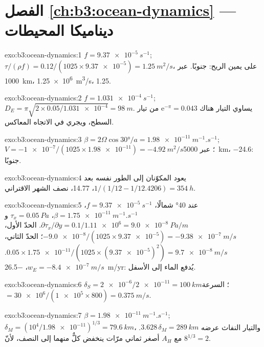 \section*{الفصل \ref{ch:b3:ocean-dynamics} --- ديناميكا المحيطات}

\begin{solution}{exo:b3:ocean-dynamics:1}
$f = \qty{9.37e-5}{s^{-1}}$; $\tau/(\rho f) = 0.12/(1025\times\num{9.37e-5})
= \qty{1.25}{m^2/s}$، على يمين الريح: جنوبًا. عبر
\qty{1000}{km}، \qty{1.25e6}{m^3/s}، \qty{1.25}{\sverdrup}.
\end{solution}

\begin{solution}{exo:b3:ocean-dynamics:2}
$f = \qty{1.031e-4}{s^{-1}}$; $D_E = \pi\sqrt{2\times0.05/\num{1.031e-4}}
= \qty{98}{m}$. يساوي التيار هناك $\mathrm e^{-\pi} = \num{0.043}$ من
تيار السطح، ويجري في الاتجاه المعاكس.
\end{solution}

\begin{solution}{exo:b3:ocean-dynamics:3}
$\beta = 2\Omega\cos\ang{30}/a = \qty{1.98e-11}{m^{-1}.s^{-1}}$; $V =
\num{-1e-7}/(1025\times\num{1.98e-11}) = \qty{-4.92}{m^2/s}$؛ عبر
\qty{5000}{km}، \qty{-24.6}{\sverdrup}: جنوبًا.
\end{solution}

\begin{solution}{exo:b3:ocean-dynamics:4}
يعود المكوّنان إلى الطور نفسه بعد $1/(1/12 - 1/12.4206) =
\qty{354}{h}$، \num{14.77}، نصف الشهر الاقتراني.
\end{solution}

\begin{solution}{exo:b3:ocean-dynamics:5}
عند \ang{40} شمالًا، $f = \qty{9.37e-5}{s^{-1}}$، $\beta =
\qty{1.75e-11}{m^{-1}.s^{-1}}$، $\tau_x = \qty{0.05}{Pa}$
و$\partial\tau_x/\partial y = 0.1/\num{1.11e6} = \qty{9.0e-8}{Pa/m}$. الحدّ
الأول، $-\num{9.0e-8}/(1025\times\num{9.37e-5}) =
\qty{-9.38e-7}{m/s}$؛ الحدّ الثاني، $0.05\times\num{1.75e-11}/(1025\times
(\num{9.37e-5})^2) = \qty{+9.7e-8}{m/s}$. $w_E = \qty{-8.4e-7}{m/s}$،
\qty{-26.5}{m/yr}: يُدفع الماء إلى الأسفل.
\end{solution}

\begin{solution}{exo:b3:ocean-dynamics:6}
$\delta_S = \num{2e-6}/\num{2e-11} = \qty{100}{km}$؛ السرعة $=
\num{30e6}/(\num{1e5}\times800) = \qty{0.375}{m/s}$.
\end{solution}

\begin{solution}{exo:b3:ocean-dynamics:7}
$\beta = \qty{1.98e-11}{m^{-1}.s^{-1}}$; $\delta_M = (10^4/\num{1.98e-11})^{1/3}
= \qty{79.6}{km}$، والتيار النفاث عرضه $3.628\,\delta_M = \qty{289}{km}$.
مع $A_H$ أصغر ثماني مرّات ينخفض كلٌّ منهما إلى النصف، لأنّ $8^{1/3} = 2$.
\end{solution}


